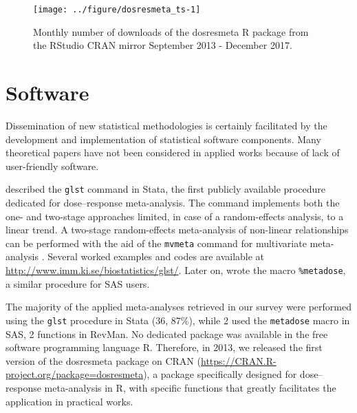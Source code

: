\documentclass[11pt,a4paper,twoside,openany]{book}\usepackage{knitr}
\newcommand{\pkg}[1]{{\fontseries{b}\selectfont #1}}
\begin{document}
{\begin{knitrout}\footnotesize
{}\color{fgcolor}\begin{figure}[ht!]

{\centering \texttt{[image: ../figure/dosresmeta\_ts-1]} 

}

\caption[Monthly number of downloads of the dosresmeta R package from the RStudio CRAN mirror September 2013 - December 2017]{Monthly number of downloads of the dosresmeta R package from the RStudio CRAN mirror September 2013 - December 2017.}\label{fig:dosresmeta_ts}
\end{figure}


\end{knitrout}



\section{Software}

Dissemination of new statistical methodologies is certainly facilitated by the development and implementation of statistical software components. Many theoretical papers have not been considered in applied works because of lack of user-friendly software. 

\noindent \cite{orsini2006generalized} described the \texttt{glst} command in Stata, the first publicly available procedure dedicated for dose--response meta-analysis. The command implements both the one- and two-stage approaches limited, in case of a random-effects analysis, to a linear trend. A two-stage random-effects meta-analysis of non-linear relationships can be performed with the aid of the \texttt{mvmeta} command for multivariate meta-analysis \citep{white2011multivariate}. Several worked examples and codes are available at \url{http://www.imm.ki.se/biostatistics/glst/}. Later on, \cite{li2010sas} wrote the macro \texttt{\%metadose}, a similar procedure for SAS users.
 
The majority of the applied meta-analyses retrieved in our survey were performed using the \texttt{glst} procedure in Stata (36, 87\%), while 2 used the \texttt{metadose} macro in SAS, 2 functions in RevMan. No dedicated package was available in the free software programming language \textsf{R}. Therefore, in 2013, we released the first version of the \pkg{dosresmeta} package on CRAN (\url{https://CRAN.R-project.org/package=dosresmeta}), a package specifically designed for dose--response meta-analysis in \textsf{R}, with specific functions that greatly facilitates the application in practical works. 

}
\end{document}
